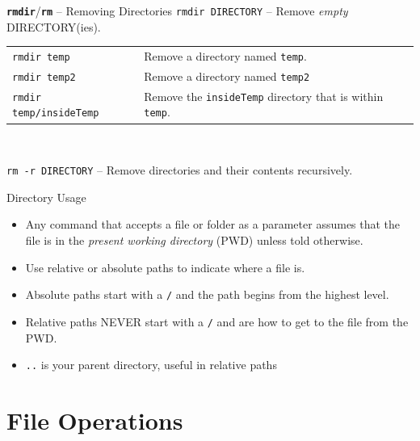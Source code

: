 \documentclass[14pt,aspectratio=1610]{beamer}
\begin{document}
\begin{frame}{\texttt{\textbf{rmdir}}/\texttt{\textbf{rm}} -- Removing Directories}
\lstinline{rmdir DIRECTORY} -- Remove \textit{empty} DIRECTORY(ies).
  \begin{tabularx}{1\textwidth}{l X}
    \lstinline{rmdir temp}            & Remove a directory named \lstinline{temp}.\\
    \lstinline{rmdir temp2}           & Remove a directory named \lstinline{temp2}\\
    \lstinline{rmdir temp/insideTemp} & Remove the \lstinline{insideTemp} directory that is within \lstinline{temp}. \\
  \end{tabularx}\\\vspace{1em}

\lstinline{rm -r DIRECTORY} -- Remove directories and their contents recursively.

\end{frame}

\begin{frame}{Directory Usage}
\begin{itemize}
\item Any command that accepts a file or folder as a parameter assumes that the file is in the \emph{present working directory} (PWD) unless told otherwise.
\item Use relative or absolute paths to indicate where a file is.
\item Absolute paths start with a \lstinline{/} and the path begins from the highest level.
\item Relative paths NEVER start with a \lstinline{/} and are how to get to the file from the PWD.
\item \lstinline{..} is your parent directory, useful in relative paths
\end{itemize}
\end{frame}

\section{File Operations}

\end{document}
